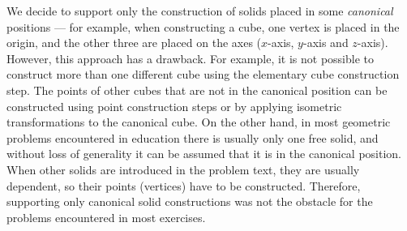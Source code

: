 \documentclass[final,1p,times,authoryear]{elsarticle}
\begin{document}
We decide to support only the construction of solids placed in some
{\em canonical} positions --- for example, when constructing a cube,
one vertex is placed in the origin, and the other three are placed on
the axes ($x$-axis, $y$-axis and $z$-axis). However, this approach has
a drawback. For example, it is not possible to construct more than one
different cube using the elementary cube construction step. The points
of other cubes that are not in the canonical position can be
constructed using point construction steps or by applying isometric
transformations to the canonical cube. On the other hand, in most
geometric problems encountered in education there is usually only one
free solid, and without loss of generality it can be assumed that it
is in the canonical position. When other solids are introduced in the
problem text, they are usually dependent, so their points (vertices)
have to be constructed. Therefore, supporting only canonical solid
constructions was not the obstacle for the problems encountered in
most exercises.
\end{document}
